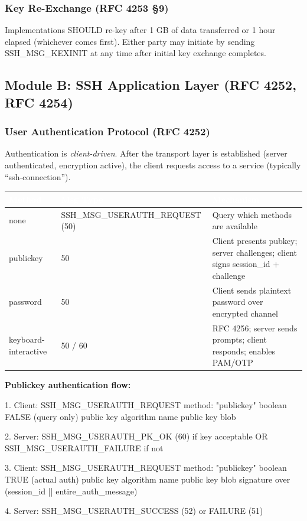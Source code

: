 \documentclass[11pt,letterpaper]{article}
\newcommand{\tableheader}[1]{\textbf{\sffamily\textcolor{white}{#1}}}
\begin{document}
\subsubsection{Key Re-Exchange (RFC 4253 \S9)}

Implementations SHOULD re-key after 1 GB of data transferred or 1 hour elapsed (whichever comes first). Either party may initiate by sending SSH\_MSG\_KEXINIT at any time after initial key exchange completes.

\subsection{Module B: SSH Application Layer (RFC 4252, RFC 4254)}

\subsubsection{User Authentication Protocol (RFC 4252)}

Authentication is \emph{client-driven}. After the transport layer is established (server authenticated, encryption active), the client requests access to a service (typically ``ssh-connection'').

\begin{center}
\begin{tabularx}{\textwidth}{L{3.5cm}L{2.5cm}X}
\toprule
{}
\tableheader{Method} & \tableheader{Msg Type} & \tableheader{Mechanism} \\
\midrule
none & SSH\_MSG\_USERAUTH\_REQUEST (50) & Query which methods are available \\
publickey & 50 & Client presents pubkey; server challenges; client signs session\_id + challenge \\
password & 50 & Client sends plaintext password over encrypted channel \\
keyboard-interactive & 50 / 60 & RFC 4256; server sends prompts; client responds; enables PAM/OTP \\
\bottomrule
\end{tabularx}
\end{center}

\textbf{Publickey authentication flow:}
\begin{asciibox}
1. Client: SSH_MSG_USERAUTH_REQUEST
           method: "publickey"
           boolean FALSE (query only)
           public key algorithm name
           public key blob

2. Server: SSH_MSG_USERAUTH_PK_OK (60) if key acceptable
           OR SSH_MSG_USERAUTH_FAILURE if not

3. Client: SSH_MSG_USERAUTH_REQUEST
           method: "publickey"
           boolean TRUE (actual auth)
           public key algorithm name
           public key blob
           signature over (session_id || entire_auth_message)

4. Server: SSH_MSG_USERAUTH_SUCCESS (52) or FAILURE (51)
\end{asciibox}
\end{document}
